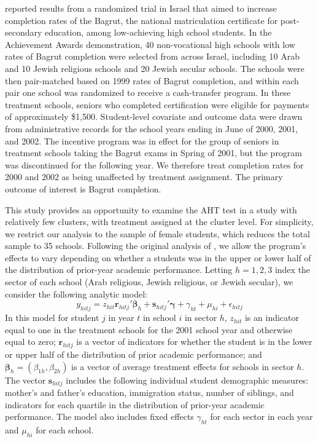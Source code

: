 \documentclass[12pt]{article}\usepackage[]{graphicx}\usepackage[]{color}
\newcommand{\bm}{\mathbf}
\newcommand{\bs}{\boldsymbol}
\begin{document}
\citet{Angrist2009effects} reported results from a randomized trial in Israel that aimed to increase completion rates of the Bagrut, the national matriculation certificate for post-secondary education, among low-achieving high school students. 
In the Achievement Awards demonstration, 40 non-vocational high schools with low rates of Bagrut completion were selected from across Israel, including 10 Arab and 10 Jewish religious schools and 20 Jewish secular schools. 
The schools were then pair-matched based on 1999 rates of Bagrut completion, and within each pair one school was randomized to receive a cash-transfer program. 
In these treatment schools, seniors who completed certification were eligible for payments of approximately \$1,500. 
Student-level covariate and outcome data were drawn from administrative records for the school years ending in June of 2000, 2001, and 2002. 
The incentive program was in effect for the group of seniors in treatment schools taking the Bagrut exams in Spring of 2001, but the program was discontinued for the following year. 
We therefore treat completion rates for 2000 and 2002 as being unaffected by treatment assignment.
The primary outcome of interest is Bagrut completion. 

This study provides an opportunity to examine the AHT test in a study with relatively few clusters, with treatment assigned at the cluster level.
For simplicity, we restrict our analysis to the sample of female students, which reduces the total sample to 35 schools.
Following the original analysis of \citet{Angrist2009effects}, we allow the program's effects to vary depending on whether a students was in the upper or lower half of the distribution of prior-year academic performance. 
Letting $h = 1,2,3$ index the sector of each school (Arab religious, Jewish religious, or Jewish secular), we consider the following analytic model: 
\begin{equation}
\label{eq:AL_ATE}
y_{hitj} = z_{hit}\bm{r}_{hitj}'\bs\beta_h + \bm{s}_{hitj}'\bs\gamma + \gamma_{ht} + \mu_{hi} + \epsilon_{hitj}
\end{equation}
In this model for student $j$ in year $t$ in school $i$ in sector $h$, $z_{hit}$ is an indicator equal to one in the treatment schools for the 2001 school year and otherwise equal to zero; $\bm{r}_{hitj}$ is a vector of indicators for whether the student is in the lower or upper half of the distribution of prior academic performance; and $\bs\beta_h = \left(\beta_{1h}, \beta_{2h}\right)$ is a vector of average treatment effects for schools in sector $h$. 
The vector $\bm{s}_{hitj}$ includes the following individual student demographic measures: mother's and father's education, immigration status, number of siblings, and indicators for each quartile in the distribution of prior-year academic performance. 
The model also includes fixed effects $\gamma_{ht}$ for each sector in each year and $\mu_{hi}$ for each school. 
\end{document}
